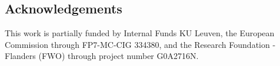 \documentclass{article}
\begin{document}
\subsection*{Acknowledgements}

This   work   is   partially   funded   by   Internal   Funds
KU  Leuven,  the European Commission through FP7-MC-CIG
334380, and the Research Foundation - Flanders (FWO) through project number G0A2716N.


 

 




\end{document}
